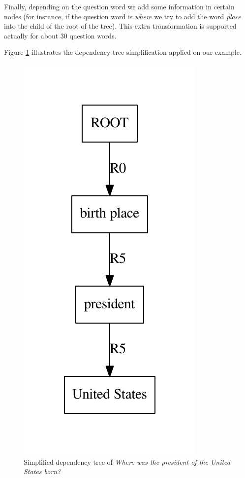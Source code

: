 Finally, depending on the question word we add some information in certain nodes (for instance, if the question word is \textit{where} we try to add the word \textit{place} into the child of the root of the tree). This extra transformation is supported actually for about 30 question words.

Figure \ref{tree_three} illustrates the dependency tree simplification applied on our example.

\begin{figure}
  \centering
    \includegraphics[scale=0.6]{../examples_NLP_grammatical/tree3bis.pdf}
  \caption{Simplified dependency tree of \emph{Where was the president of the United States born?}}
  \label{tree_three}
\end{figure}

